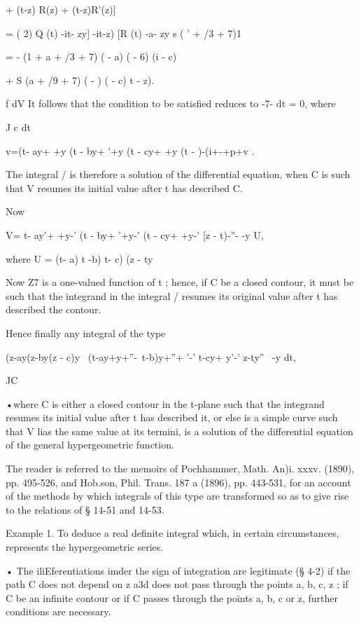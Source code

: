 + (t-z) R(z) + (t-z)R'(z)] 

= ( 2)  Q (t) -it- zy]  -it-z) [R (t) -a- zy s ( ' + /3 + 7)1 

= - (1 + a + /3 + 7) (  - a) (  - 6) (i - c) 

+ S (a + /9 + 7) (  -  ) (  - c)  t - z). 

f dV 
It follows that the condition to be satisfied reduces to -7- dt = 0, where 

J c dt 

v=(t- ay+ +y (t - by+ '+y (t - cy+ +y (t -  )-(i+-+p+v . 

The integral / is therefore a solution of the differential equation, when 
C is such that V resumes its initial value after t has described C. 

Now 

V= t- ay'+ +y-' (t - by+ '+y-' (t - cy+ +y-' [z - t)-''- -y U, 

where U = (t- a)  t -b) t- c) (z - ty\ 

Now Z7 is a one-valued function of t ; hence, if C be a closed contour, it 
must be such that the integrand in the integral / resumes its original value 
after t has described the contour. 

Hence finally any integral of the type 

(z-ay(z-by(z - c)y \ (t-ay+y+''-\ t-b)y+''+ '-' t-cy+ y'-' z-ty''~ -y dt, 

JC 

•where C is either a closed contour in the t-plane such that the integrand 
resumes its initial value after t has described it, or else is a simple curve such 
that V lias the same value at its termini, is a solution of the differential equation 
of the general hypergeometric function. 

The reader is referred to the memoirs of Pochhammer, Math. An)i. xxxv. (1890), 
pp. 495-526, and Hob.son, Phil. Trans. 187 a (1896), pp. 443-531, for an account of the 
methods by which integrals of this type are transformed so as to give rise to the relations 
of  § 14-51 and 14-53. 

Example 1. To deduce a real definite integral which, in certain circumstances, 
represents the hypergeometric series. 

• The iliEferentiations imder the sign of integration are legitimate (§ 4-2) if the path C does 
not depend on z a3d does not pass through the points a, b, c, z ; if C be an infinite contour or if 
C passes through the points a, b, c or z, further conditions are necessary. 



